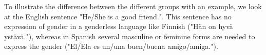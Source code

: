 To illustrate the difference between the different groups with an example, we look at the English sentence "He/She is a good friend.". This sentence has no expression of gender in a genderless language like Finnish ("Hän on hyvä ystävä."), whereas in Spanish several masculine or feminine forms are needed to express the gender ("El/Ela es un/una buen/buena amigo/amiga."). 

